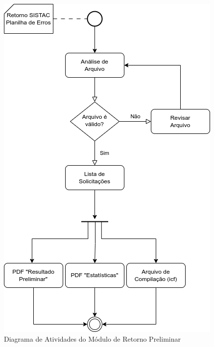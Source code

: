\documentclass[
	12pt,			%
	openright,		%
	oneside,	
	a4paper,		%
	english,		%
	brazil			%
]{abntex2/abntex2}  %
\begin{document}
		\clearpage
		\begin{figure}[ht]
			\begin{center}
				
				\caption{Diagrama de Atividades do Módulo de Retorno Preliminar}
				\includegraphics[scale=0.85]{img/diagrama-ativs-prelim}
				
			\end{center}
		\end{figure}
		
\end{document}
